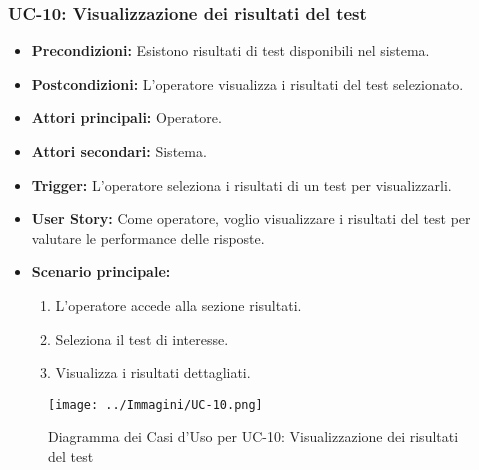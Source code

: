 \documentclass[a4paper, 12pt]{article}
\begin{document}
\subsubsection{UC-10: Visualizzazione dei risultati del test}
\begin{itemize}
    \item \textbf{Precondizioni:} Esistono risultati di test disponibili nel sistema.
    \item \textbf{Postcondizioni:} L'operatore visualizza i risultati del test selezionato.
    \item \textbf{Attori principali:} Operatore.
    \item \textbf{Attori secondari:} Sistema.
    \item \textbf{Trigger:} L'operatore seleziona i risultati di un test per visualizzarli.
    \item \textbf{User Story:} Come operatore, voglio visualizzare i risultati del test per valutare le performance delle risposte.
    \item \textbf{Scenario principale:}
    \begin{enumerate}
        \item L'operatore accede alla sezione risultati.
        \item Seleziona il test di interesse.
        \item Visualizza i risultati dettagliati.
    \end{enumerate}
\end{itemize}
\begin{figure}[hbt!]
    \centering
    \texttt{[image: ../Immagini/UC-10.png]}
    \caption{Diagramma dei Casi d'Uso per UC-10: Visualizzazione dei risultati del test}
    \label{fig:uc1-diagram}
\end{figure}
\end{document}
